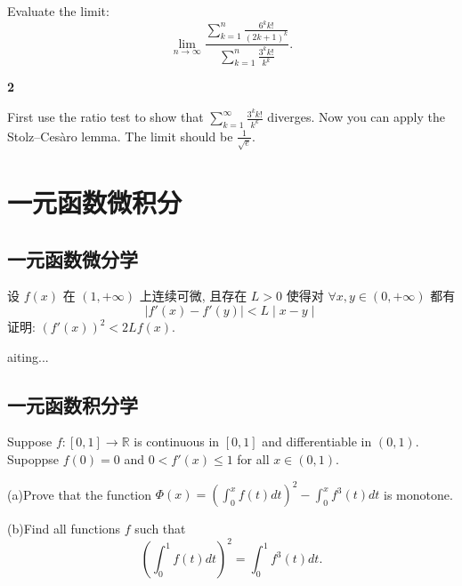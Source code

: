 \documentclass[12pt]{article}
\newenvironment{solution}[2][Solution]{\begin{trivlist}
\item[\hskip \labelsep {\bfseries #1}]}{\end{trivlist}}
\newenvironment{problem}[2][Problem]{\begin{trivlist}
\item[\hskip \labelsep {\bfseries #1}\hskip \labelsep {\bfseries #2.}]}{\end{trivlist}}
\begin{document}
\vspace{3cm}

\begin{problem}{2}
    Evaluate the limit:
    \[
        \lim_{n \to \infty} \frac{\sum_{k=1}^{n}\frac{6^k k!}{(2k+1)^k}}{\sum_{k=1}^{n} \frac{3^k k!}{k^k}}.
    \]
\end{problem}

\begin{solution}{2} \textbf{2}

    First use the ratio test to show that $\sum_{k=1}^{\infty}\frac{3^kk!}{k^k}$ diverges. Now you can apply the Stolz–Cesàro lemma. 
    The limit should be $\frac{1}{\sqrt{e}}.$
    
\end{solution}


\section{一元函数微积分}

\subsection{一元函数微分学}

\begin{problem}{3}
设 $f(x)$ 在 $(1,+\infty)$ 上连续可微, 且存在 $L>0$ 使得对 $\forall x, y \in (0, +\infty)$ 都有
\[
\mid f'(x)-f'(y) \mid < L\mid x-y\mid
\]
证明: $(f'(x))^2 < 2Lf(x)$.

\end{problem}

\begin{solution}

Waiting...
\end{solution}

\vspace{5cm}


\pagebreak









\subsection{一元函数积分学}

\begin{problem}{3}

    Suppose $ f: [0, 1] \to \mathbb{R} $ is continuous in $[0,1]$ and differentiable in $(0,1)$. Supoppse $f(0) = 0$ and 
    $0<f'(x)\leq 1$ for all $x \in (0,1)$. 
    \item (a)Prove that the function $\Phi (x) = (\int_{0}^{x} f(t)dt)^2 - \int_{0}^{x} f^3(t)dt$ is monotone.
    \item (b)Find all functions $f$ such that
        \[
            (\int_{0}^{1} f(t) dt)^2 = \int_{0}^{1} f^3(t) dt.
        \]
    
\end{problem}
\end{document}
